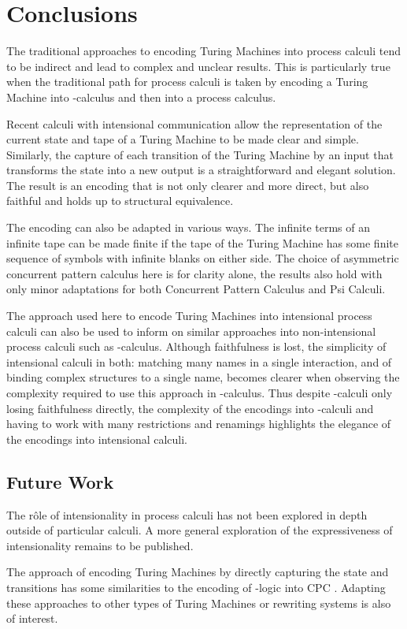 \documentclass[submission,copyright,creativecommons]{eptcs}
\begin{document}
\section{Conclusions}
\label{sec:conc}

The traditional approaches to encoding Turing Machines into process calculi
tend to be indirect and lead to complex and unclear results.
This is particularly true when the traditional path for process calculi is
taken by encoding a Turing Machine into -calculus and then into a 
process calculus.

Recent calculi with intensional communication allow the representation of
the current state and tape of a Turing Machine to be made clear and simple.
Similarly, the capture of each transition of the Turing Machine by an
input that transforms the state into a new output is a straightforward and
elegant solution.
The result is an encoding that is not only clearer and more direct, but also
faithful and holds up to structural equivalence.

The encoding can also be adapted in various ways.
The infinite terms of an infinite tape can be made finite if the tape of
the Turing Machine has some finite sequence of symbols with infinite blanks
on either side.
The choice of asymmetric concurrent pattern calculus here is for clarity alone,
the results also hold with only minor adaptations for both Concurrent Pattern
Calculus and Psi Calculi.

The approach used here to encode Turing Machines into intensional process calculi
can also be used to inform on similar approaches into non-intensional process
calculi such as -calculus. Although faithfulness is lost, the
simplicity of intensional calculi in both: matching many names in a single interaction,
and of binding complex structures to a single name, becomes clearer when observing
the complexity required to use this approach in -calculus.
Thus despite -calculi only losing faithfulness directly, the complexity of
the encodings into -calculi and having to work with many restrictions and
renamings highlights the elegance of the
encodings into intensional calculi.

\subsection*{Future Work}

The r\^ole of intensionality in process calculi has not been explored in depth
outside of particular calculi. A more general exploration of the expressiveness
of intensionality remains to be published.

The approach of encoding Turing Machines by directly capturing the state and
transitions has some similarities to the encoding of -logic \cite{jay2011}
into CPC \cite{GivenWilsonPhD}.
Adapting these approaches to other types of Turing Machines or rewriting
systems is also of interest.




\end{document}
